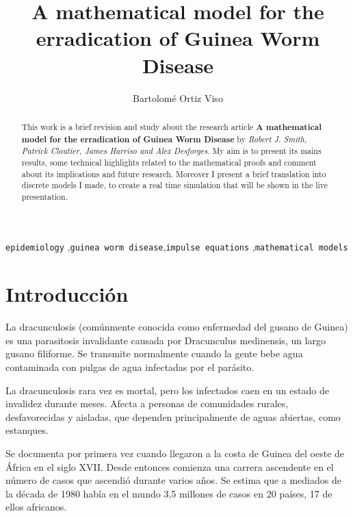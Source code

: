 \documentclass[1p]{elsarticle}
\begin{document}
\begin{frontmatter}

\title{A mathematical model for the erradication of Guinea Worm Disease}

\author{Bartolomé Ortiz Viso}
\address{Master en Fisica y matemáticas\\ Universidad de Granada\\17/01/2018}

\begin{abstract}
This work is a brief revision and study about the research article  \textbf{A mathematical model for the erradication of Guinea Worm Disease}\cite{original} by \textit{Robert J. Smith, Patrick Cloutier, James Harriso and Alex Desforges}. My aim is to present its mains results, some technical highlights related to the mathematical proofs and comment about its implications and future research. Moreover I present a brief translation into discrete models I made, to create a real time simulation that will be shown in the live presentation.
\end{abstract}

\begin{keyword}
 \texttt{epidemiology} \sep \texttt{guinea worm disease}\sep \texttt{impulse equations} \sep \texttt{mathematical models}

\end{keyword}

\end{frontmatter}

\linenumbers

\section{Introducción}
 La dracunculosis (comúnmente conocida como enfermedad del gusano de Guinea) es una parasitosis invalidante causada por Dracunculus medinensis, un largo gusano filiforme. Se transmite normalmente cuando la gente bebe agua contaminada con pulgas de agua infectadas por el parásito.
 
 La dracunculosis rara vez es mortal, pero los infectados caen en un estado de invalidez durante meses. Afecta a personas de comunidades rurales, desfavorecidas y aisladas, que dependen principalmente de aguas abiertas, como estanques.

Se documenta por primera vez cuando llegaron a la costa de Guinea del oeste de África en el siglo XVII. Desde entonces comienza una carrera ascendente en el número de casos que ascendió durante varios años. Se estima que a mediados de la década de 1980 había en el mundo 3,5 millones de casos en 20 países, 17 de ellos africanos. \cite{oms}
\end{document}
